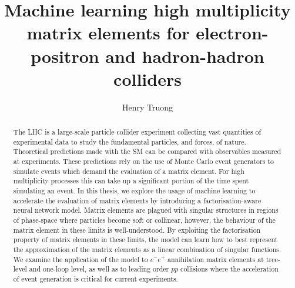 \documentclass[twoside,openright,frontopenright]{ip3thesis}
\begin{document}
\title{Machine learning high multiplicity matrix elements for electron-positron and hadron-hadron colliders}
\author{Henry Truong}
\maketitlepage*

\begin{abstract}
%
	The LHC is a large-scale particle collider experiment
	collecting vast quantities of experimental data to study the fundamental
	particles, and forces, of nature. Theoretical predictions made with
	the SM can be compared with observables measured at experiments.
	These predictions rely on the use of Monte Carlo event generators to 
	simulate events which demand the evaluation of a matrix element.
	For high multiplicity processes this can take up a significant
	portion of the time spent simulating an event.
	In this thesis, we explore the usage of machine learning
	to accelerate the evaluation of matrix elements by introducing a
	factorisation-aware neural network model. Matrix elements are plagued with singular
	structures in regions of phase-space where particles become soft or collinear,
	however, the behaviour of the matrix element in these limits is well-understood.
	By exploiting the factorisation property of matrix elements in these limits,
	the model can learn how to best represent the approximation
	of the matrix elements as a linear combination of singular functions.
	We examine the application of the model to $e^{-}e^{+}$
	annihilation matrix elements at tree-level and one-loop level, as well
	as to leading order $pp$ collisions where the acceleration of event generation
	is critical for current experiments.
%
\end{abstract}

\disableprotrusion
\tableofcontents*
\listoffigures
\listoftables
\enableprotrusion
\end{document}
